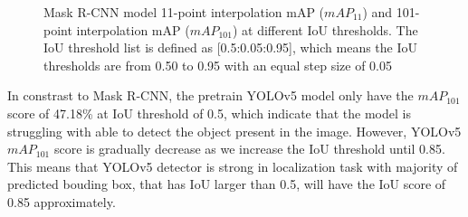 \begin{figure}[!ht]
    \centering
    \quad
    \caption{Mask R-CNN model 11-point interpolation mAP ($mAP_{11}$) and 101-point interpolation mAP ($mAP_{101}$) at different IoU thresholds. The IoU threshold list is defined as [0.5:0.05:0.95], which means the IoU thresholds are from 0.50 to 0.95 with an equal step size of 0.05}  \label{fig:mrcnn_map}
\end{figure}

In constrast to Mask R-CNN, the pretrain YOLOv5 model only have the $mAP_{101}$ score of 47.18\% at IoU threshold of 0.5, which indicate that the model is struggling with able to detect the object present in the image. However, YOLOv5 $mAP_{101}$ score is gradually decrease as we increase the IoU threshold until 0.85. This means that YOLOv5 detector is strong in localization task with majority of predicted bouding box, that has IoU larger than 0.5, will have the IoU score of 0.85 approximately.

